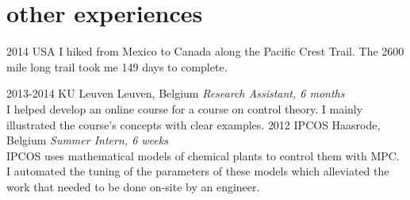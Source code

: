 \documentclass[]{twentysecondcv}
\begin{document}
\section{other experiences}
\begin{twenty}
  \twentyitem
    {2014}
    {}
    {USA}
    {I hiked from Mexico to Canada along the Pacific Crest Trail. The 2600 mile long trail took me 149 days to complete.}

  \twentyitem
    {2013-2014}
    {KU Leuven}
    {Leuven, Belgium}
    {\textit{Research Assistant, 6 months}\\I helped develop an online course for a course on control theory. I mainly illustrated the course’s concepts with clear examples.}
  \twentyitem
    {2012}
    {IPCOS}
    {Haasrode, Belgium}
    {\textit{Summer Intern, 6 weeks}\\IPCOS uses mathematical models of chemical plants to control them with MPC. I automated the tuning of the parameters of these models which alleviated the work that needed to be done on-site by an engineer.}
\end{twenty}
\end{document}
